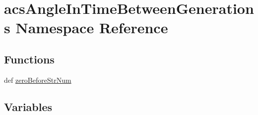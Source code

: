 \hypertarget{a00090}{\section{acs\-Angle\-In\-Time\-Between\-Generations Namespace Reference}
\label{a00090}
}
\subsection*{Functions}
\begin{DoxyCompactItemize}
\item 
def \hyperlink{a00090_aaf526cfff328bc58345967069b8fbae0}{zero\-Before\-Str\-Num}
\end{DoxyCompactItemize}
\subsection*{Variables}

